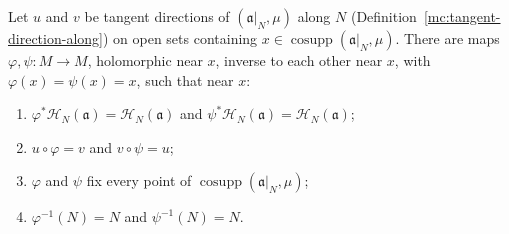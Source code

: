 \begin{theorem}
\label{mc:glueing-lemma-along}
\leanok
Let \(u\) and \(v\) be tangent directions of \((\mathfrak a|_N,\mu)\) along \(N\) (Definition~\ref{mc:tangent-direction-along}) on open sets containing
\(x\in\operatorname{cosupp}(\mathfrak a|_N,\mu)\). There are maps \(\varphi,\psi\colon M\to M\), holomorphic near \(x\), inverse to each other near \(x\), with
\(\varphi(x)=\psi(x)=x\), such that near \(x\):
\begin{enumerate}
\item \(\varphi^*\mathcal H_N(\mathfrak a)=\mathcal H_N(\mathfrak a)\) and \(\psi^*\mathcal H_N(\mathfrak a)=\mathcal H_N(\mathfrak a)\);
\item \(u\circ\varphi=v\) and \(v\circ\psi=u\);
\item \(\varphi\) and \(\psi\) fix every point of \(\operatorname{cosupp}(\mathfrak a|_N,\mu)\);
\item \(\varphi^{-1}(N)=N\) and \(\psi^{-1}(N)=N\).
\end{enumerate}
\end{theorem}
